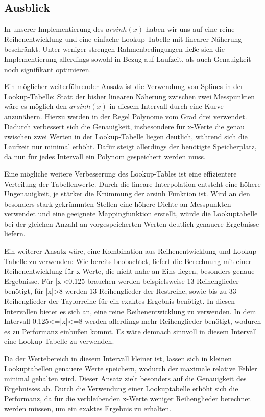 \documentclass[course=erap] {aspdoc}
\begin{document}
    \subsection{Ausblick}

    In unserer Implementierung des $arsinh(x)$ haben wir uns auf eine reine Reihenentwicklung und eine einfache Lookup-Tabelle mit linearer Näherung beschränkt.
    Unter weniger strengen Rahmenbedingungen ließe sich die Implementierung allerdings sowohl in Bezug auf Laufzeit, als auch Genauigkeit noch signifikant optimieren.

    Ein möglicher weiterführender Ansatz ist die Verwendung von Splines in der Lookup-Tabelle:
    Statt der bisher linearen Näherung zwischen zwei Messpunkten wäre es möglich den $arsinh(x)$ in diesem Intervall durch eine Kurve anzunähern.
    Hierzu werden in der Regel Polynome vom Grad drei verwendet.~\cite{????}
    Dadurch verbessert sich die Genauigkeit, insbesondere für x-Werte die genau zwischen zwei Werten in der Lookup-Tabelle liegen deutlich, während sich die Laufzeit nur minimal erhöht.
    Dafür steigt allerdings der benötigte Speicherplatz, da nun für jedes Intervall ein Polynom gespeichert werden muss.

    Eine mögliche weitere Verbesserung des Lookup-Tables ist eine effizientere Verteilung der Tabellenwerte.
    Durch die lineare Interpolation entsteht eine höhere Ungenauigkeit, je stärker die Krümmung der arsinh Funktion ist.
    Wird an den besonders stark gekrümmten Stellen eine höhere Dichte an Messpunkten verwendet und eine geeignete Mappingfunktion erstellt, würde die Lookuptabelle bei der gleichen Anzahl an vorgespeicherten Werten deutlich genauere Ergebnisse liefern.

    Ein weiterer Ansatz wäre, eine Kombination aus Reihenentwicklung und Lookup-Tabelle zu verwenden:
    Wie bereits beobachtet, liefert die Berechnung mit einer Reihenentwicklung für x-Werte, die nicht nahe an Eins liegen, besonders genaue Ergebnisse.
    Für |x|<0.125 brauchen werden beispielsweise 13 Reihenglieder benötigt, für |x|>8 werden 13 Reihenglieder der Restreihe, sowie bis zu 33 Reihenglieder der Taylorreihe für ein exaktes Ergebnis benötigt.
    In diesen Intervallen bietet es sich an, eine reine Reihenentwicklung zu verwenden.
    In dem Intervall 0.125<=|x|<=8 werden allerdings mehr Reihenglieder benötigt, wodurch es zu Performanz einbußen kommt.
    Es wäre demnach sinnvoll in diesem Intervall eine Lookup-Tabelle zu verwenden.

    Da der Wertebereich in diesem Intervall kleiner ist, lassen sich in kleinen Lookuptabellen genauere Werte speichern, wodurch der maximale relative Fehler minimal gehalten wird.
    Dieser Ansatz zielt besonders auf die Genauigkeit des Ergebnisses ab.
    Durch die Verwendung einer Lookuptabelle erhöht sich die Performanz, da für die verbleibenden x-Werte weniger Reihenglieder berechnet werden müssen, um ein exaktes Ergebnis zu erhalten.
\end{document}

